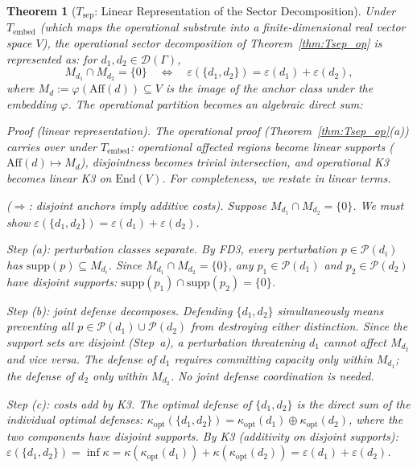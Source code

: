 \documentclass[11pt,a4paper]{article}
\newtheorem{theorem}{Theorem}[section]
\theoremstyle{definition}
\newcommand{\eps}{\varepsilon}
\newcommand{\End}{\mathrm{End}}
\begin{document}
\begin{theorem}[$T_{\mathrm{sep}}$: Linear Representation of the Sector Decomposition]\label{thm:Tsep}
Under $T_{\mathrm{embed}}$ (which maps the operational substrate into a finite-dimensional real vector space $V$), the operational sector decomposition of Theorem~\ref{thm:Tsep_op} is represented as: for $d_1, d_2 \in \mathcal{D}(\Gamma)$,
\[
M_{d_1} \cap M_{d_2} = \{0\} \quad\Longleftrightarrow\quad \eps(\{d_1, d_2\}) = \eps(d_1) + \eps(d_2),
\]
where $M_d := \varphi(\mathrm{Aff}(d)) \subseteq V$ is the image of the anchor class under the embedding $\varphi$.  The operational partition becomes an algebraic direct sum:

\smallskip\noindent\textit{Proof (linear representation).}  The operational proof (Theorem~\ref{thm:Tsep_op}(a)) carries over under $T_{\mathrm{embed}}$: operational affected regions become linear supports ($\mathrm{Aff}(d) \mapsto M_d$), disjointness becomes trivial intersection, and operational K3 becomes linear K3 on $\End(V)$.  For completeness, we restate in linear terms.

\textit{($\Rightarrow$: disjoint anchors imply additive costs).}  Suppose $M_{d_1} \cap M_{d_2} = \{0\}$.  We must show $\eps(\{d_1, d_2\}) = \eps(d_1) + \eps(d_2)$.

\textit{Step (a): perturbation classes separate.}  By FD3, every perturbation $p \in \mathcal{P}(d_i)$ has $\mathrm{supp}(p) \subseteq M_{d_i}$.  Since $M_{d_1} \cap M_{d_2} = \{0\}$, any $p_1 \in \mathcal{P}(d_1)$ and $p_2 \in \mathcal{P}(d_2)$ have disjoint supports: $\mathrm{supp}(p_1) \cap \mathrm{supp}(p_2) = \{0\}$.

\textit{Step (b): joint defense decomposes.}  Defending $\{d_1, d_2\}$ simultaneously means preventing all $p \in \mathcal{P}(d_1) \cup \mathcal{P}(d_2)$ from destroying either distinction.  Since the support sets are disjoint (Step~a), a perturbation threatening $d_1$ cannot affect $M_{d_2}$ and vice versa.  The defense of $d_1$ requires committing capacity only within $M_{d_1}$; the defense of $d_2$ only within $M_{d_2}$.  No joint defense coordination is needed.

\textit{Step (c): costs add by K3.}  The optimal defense of $\{d_1, d_2\}$ is the direct sum of the individual optimal defenses: $\kappa_{\mathrm{opt}}(\{d_1,d_2\}) = \kappa_{\mathrm{opt}}(d_1) \oplus \kappa_{\mathrm{opt}}(d_2)$, where the two components have disjoint supports.  By K3 (additivity on disjoint supports): $\eps(\{d_1,d_2\}) = \inf \kappa = \kappa(\kappa_{\mathrm{opt}}(d_1)) + \kappa(\kappa_{\mathrm{opt}}(d_2)) = \eps(d_1) + \eps(d_2)$.


\end{theorem}
\end{document}
